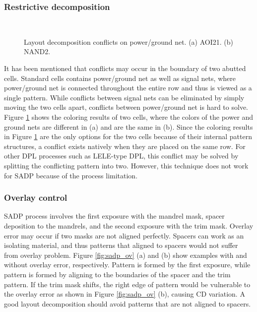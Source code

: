 \subsubsection{Restrictive decomposition}
\begin{figure}[b]
\centering
\mbox{
\hspace{0.20in}
}
\caption{Layout decomposition conflicts on power/ground net. (a) AOI21. (b) NAND2.}
  \label{fig:pg_prob}
\end{figure}

It has been mentioned that conflicts may occur in the boundary of two abutted cells. Standard cells contains power/ground net as well as signal nets, where power/ground net is connected throughout the entire row and thus is viewed as a single pattern. While conflicts between signal nets can be eliminated by simply moving the two cells apart, conflicts between power/ground net is hard to solve. Figure \ref{fig:pg_prob} shows the coloring results of two cells, where the colors of the power and ground nets are different in (a) and are the same in (b). Since the coloring results in Figure \ref{fig:pg_prob} are the only options for the two cells because of their internal pattern structures, a conflict exists natively when they are placed on the same row. For other DPL processes such as LELE-type DPL, this conflict may be solved by splitting the conflicting pattern into two. However, this technique does not work for SADP because of the process limitation.

\subsubsection{Overlay control}
SADP process involves the first exposure with the mandrel mask, spacer deposition to the mandrels, and the second exposure with the trim mask. Overlay error may occur if two masks are not aligned perfectly. Spacers can work as  an isolating material, and thus patterns that aligned to spacers would not suffer from overlay problem. Figure \ref{fig:sadp_ov} (a) and (b) show examples with and without overlay error, respectively. Pattern  is formed by the first exposure, while pattern  is formed by aligning to the boundaries of the spacer and the trim pattern. If the trim mask shifts, the right edge of pattern  would be vulnerable to the overlay error as shown in Figure \ref{fig:sadp_ov} (b), causing CD variation. A good layout decomposition should avoid patterns that are not aligned to spacers.

